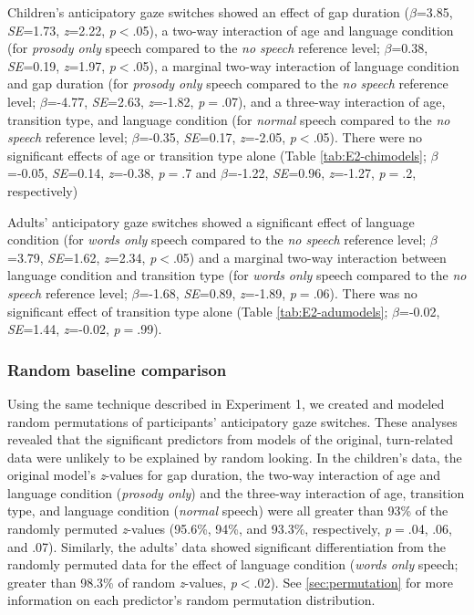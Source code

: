 \documentclass[authoryear, 12pt]{elsarticle}
\begin{document}
Children's anticipatory gaze switches showed an effect of gap duration (\textit{$\beta$}=3.85, \textit{SE}=1.73, \textit{z}=2.22, \textit{p}$<$.05), a two-way interaction of age and language condition (for \textit{prosody only} speech compared to the \textit{no speech} reference level; \textit{$\beta$}=0.38, \textit{SE}=0.19, \textit{z}=1.97, \textit{p}$<$.05), a marginal two-way interaction of language condition and gap duration (for \textit{prosody only} speech compared to the \textit{no speech} reference level; \textit{$\beta$}=-4.77, \textit{SE}=2.63, \textit{z}=-1.82, \textit{p}$=$.07), and a three-way interaction of age, transition type, and language condition (for \textit{normal} speech compared to the \textit{no speech} reference level; \textit{$\beta$}=-0.35, \textit{SE}=0.17, \textit{z}=-2.05, \textit{p}$<$.05). There were no significant effects of age or transition type alone (Table \ref{tab:E2-chimodels}; \textit{$\beta$}=-0.05, \textit{SE}=0.14, \textit{z}=-0.38, \textit{p}$=$.7 and \textit{$\beta$}=-1.22, \textit{SE}=0.96, \textit{z}=-1.27, \textit{p}$=$.2, respectively)

Adults' anticipatory gaze switches showed a significant effect of language condition (for \textit{words only} speech compared to the \textit{no speech} reference level; \textit{$\beta$}=3.79, \textit{SE}=1.62, \textit{z}=2.34, \textit{p}$<$.05) and a marginal two-way interaction between language condition and transition type (for \textit{words only} speech compared to the \textit{no speech} reference level; \textit{$\beta$}=-1.68, \textit{SE}=0.89, \textit{z}=-1.89, \textit{p}$=$.06). There was no significant effect of transition type alone (Table \ref{tab:E2-adumodels}; \textit{$\beta$}=-0.02, \textit{SE}=1.44, \textit{z}=-0.02, \textit{p}$=$.99).


\subsubsection*{Random baseline comparison}
\label{sec:randbaseline2}

Using the same technique described in Experiment 1, we created and modeled random permutations of participants' anticipatory gaze switches. These analyses revealed that the significant predictors from models of the original, turn-related data were unlikely to be explained by random looking. In the children's data, the original model's \textit{z}-values for gap duration, the two-way interaction of age and language condition (\textit{prosody only}) and the three-way interaction of age, transition type, and language condition (\textit{normal} speech) were all greater than 93\% of the randomly permuted \textit{z}-values (95.6\%, 94\%, and 93.3\%, respectively, \textit{p}$=$.04, .06, and .07). Similarly, the adults' data showed significant differentiation from the randomly permuted data for the effect of language condition (\textit{words only} speech; greater than 98.3\% of random \textit{z}-values, \textit{p}$<$.02). See \ref{sec:permutation} for more information on each predictor's random permutation distribution.
\end{document}
